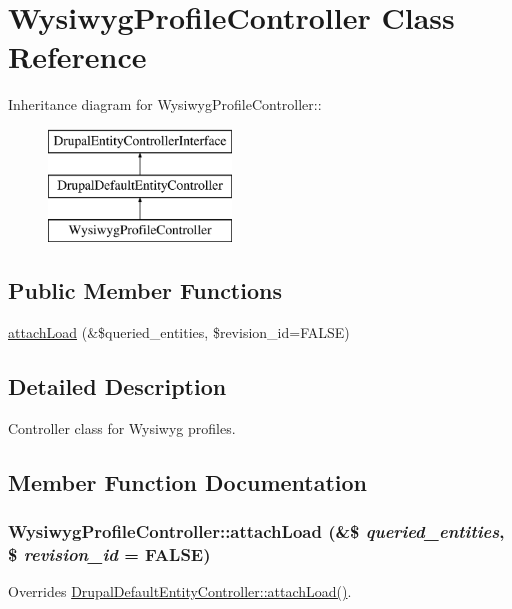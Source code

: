 \hypertarget{classWysiwygProfileController}{
\section{WysiwygProfileController Class Reference}
\label{classWysiwygProfileController}
}
Inheritance diagram for WysiwygProfileController::\begin{figure}[H]
\begin{center}
\leavevmode
\includegraphics[height=3cm]{classWysiwygProfileController}
\end{center}
\end{figure}
\subsection*{Public Member Functions}
\begin{DoxyCompactItemize}
\item 
\hyperlink{classWysiwygProfileController_a0a4f9e5386dd5e410f77ac21509cd13b}{attachLoad} (\&\$queried\_\-entities, \$revision\_\-id=FALSE)
\end{DoxyCompactItemize}


\subsection{Detailed Description}
Controller class for Wysiwyg profiles. 

\subsection{Member Function Documentation}
\hypertarget{classWysiwygProfileController_a0a4f9e5386dd5e410f77ac21509cd13b}{
\subsubsection[{attachLoad}]{\setlength{\rightskip}{0pt plus 5cm}WysiwygProfileController::attachLoad (\&\$ {\em queried\_\-entities}, \/  \$ {\em revision\_\-id} = {\ttfamily FALSE})}}
\label{classWysiwygProfileController_a0a4f9e5386dd5e410f77ac21509cd13b}
Overrides \hyperlink{classDrupalDefaultEntityController_a68735c41d2ba655a073c64983754edf7}{DrupalDefaultEntityController::attachLoad()}. 

